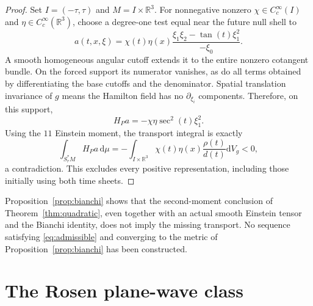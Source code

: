 \documentclass[11pt,a4paper]{article}
\numberwithin{equation}{section}
\newcommand{\dd}{\mathrm d}
\newcommand{\R}{\mathbb R}
\newcommand{\f}[2]{\frac{#1}{#2}}
\theoremstyle{definition}
\begin{document}
\begin{proof}
Set $I=(-\tau,\tau)$ and $M=I\times\R^3$.
For nonnegative nonzero $\chi\in C_c^\infty(I)$ and
$\eta\in C_c^\infty(\R^3)$, choose a degree-one test equal near
the future null shell to
\begin{equation*}
a(t,x,\xi)=\chi(t)\eta(x)
\f{\xi_1\xi_2-\tan(t)\xi_1^2}{-\xi_0}.
\end{equation*}
A smooth homogeneous angular cutoff extends it to the entire nonzero cotangent bundle. On the forced support its numerator vanishes, as do all terms obtained by differentiating the base cutoffs and the denominator. Spatial translation invariance of $g$ means the Hamilton field has no $\partial_{\xi_i}$ components. Therefore, on this support,
\begin{equation*}
H_Pa=-\chi\eta\sec^2(t)\xi_1^2.
\end{equation*}
Using the $11$ Einstein moment, the transport integral is exactly
\begin{equation*}
\int_{S_r^*M}H_Pa\,\dd\mu=-\int_{I\times\R^3}\chi(t)\eta(x)\f{\rho(t)}{d(t)}\dd V_g<0,
\end{equation*}
a contradiction. This excludes every positive representation, including those initially using both time sheets.
\end{proof}

Proposition~\ref{prop:bianchi} shows that the second-moment conclusion of Theorem~\ref{thm:quadratic}, even together with an actual smooth Einstein tensor and the Bianchi identity, does not imply the missing transport. No sequence satisfying \eqref{eq:admissible} and converging to the metric of Proposition~\ref{prop:bianchi} has been constructed.

\section{The Rosen plane-wave class}\label{sec:rosen}
\end{document}
